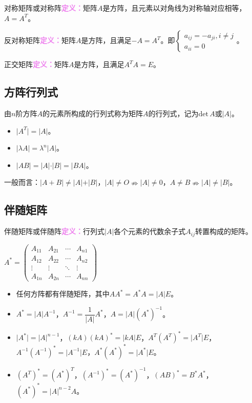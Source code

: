 \documentclass[UTF8, 12pt]{ctexart}
\begin{document}
对称矩阵或对称阵\textcolor{violet}{\textbf{定义：}}矩阵$A$是方阵，且元素以对角线为对称轴对应相等，$A=A^T$。

反对称矩阵\textcolor{violet}{\textbf{定义：}}矩阵$A$是方阵，且满足$-A=A^T$。即$\left\{\begin{array}{l}
    a_{ij}=-a_{ji},i\neq j \\
    a_{ii}=0
\end{array}\right.$。

正交矩阵\textcolor{violet}{\textbf{定义：}}矩阵$A$是方阵，且满足$A^TA=E$。

\subsection{方阵行列式}

由$n$阶方阵$A$的元素所构成的行列式称为矩阵$A$的行列式，记为$\textrm{det}\,A$或$\vert A\vert$。

\begin{itemize}
    \item $\vert A^T\vert=\vert A\vert$。
    \item $\vert\lambda A\vert=\lambda^n\vert A\vert$。
    \item $\vert AB\vert=\vert A\vert\cdot\vert B\vert=\vert BA\vert$。
\end{itemize}

一般而言：$\vert A+B\vert\neq\vert A\vert+\vert B\vert$，$\vert A\vert\neq O\nRightarrow\vert A\vert\neq0$，$A\neq B\nRightarrow\vert A\vert\neq\vert B\vert$。

\subsection{伴随矩阵}

伴随矩阵或伴随阵\textcolor{violet}{\textbf{定义：}}行列式$\vert A\vert$各个元素的代数余子式$A_{ij}$转置构成的矩阵。

$A^*=\left(
    \begin{array}{cccc}
        A_{11} & A_{21} & \cdots & A_{n1} \\
        A_{12} & A_{22} & \cdots & A_{n2} \\
        \vdots & \vdots & \ddots & \vdots \\
        A_{1n} & A_{2n} & \cdots & A_{nn}
    \end{array}
\right)$

\begin{itemize}
    \item 任何方阵都有伴随矩阵，其中$AA^*=A^*A=\vert A\vert E$。
    \item $A^*=\vert A\vert A^{-1}$，$A^{-1}=\dfrac{1}{\vert A\vert}A^*$，$A=\vert A\vert(A^*)^{-1}$。
    \item $\vert A^*\vert=\vert A\vert^{n-1}$，$(kA)(kA)^*=\vert kA\vert E$，$A^T(A^T)^*=\vert A^T\vert E$，$A^{-1}(A^{-1})^*=\vert A^{-1}\vert E$，$A^*(A^*)^*=\vert A^*\vert E$。
    \item $(A^T)^*=(A^*)^T$，$(A^{-1})^*=(A^*)^{-1}$，$(AB)^*=B^*A^*$，$(A^*)^*=\vert A\vert^{n-2}A$。
\end{itemize}
\end{document}

